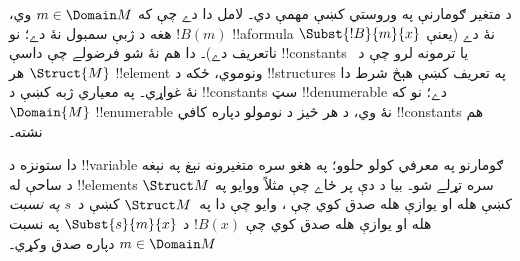 \documentclass[../../../include/open-logic-section]{subfiles}
\begin{document}
\begin{explain}
د متغير ګومارنې په وروستي
 کښې مهمې
دي۔ لامل دا دے چې که
$m \in \Domain M$ وي، هغه د ژبې سمبول نۀ دے؛ نو $!B(m)$
!!a{formula} نۀ دے (يعنې $\Subst{!B}{m}{x}$ ناتعريف دے)۔ دا هم نۀ
شو فرضولے چې داسې !!{constant}s يا ترمونه لرو چې د~$\Struct{M}$ هر
!!{element} ونوموي، ځکه د !!{structure}s په تعريف کښې هېڅ شرط دا
نۀ غواړي۔ په معياري ژبه کښې د !!{constant}s سټ !!{denumerable} دے؛
نو که $\Domain{M}$ !!{enumerable} نۀ وي، د هر څيز د نومولو دپاره
کافي !!{constant}s هم نشته۔

دا ستونزه د !!{variable} ګومارنو په معرفي کولو حلوو؛ په هغو سره
متغيرونه نېغ په نېغه د ساحې له !!{element}s سره تړلے شو۔ بيا د دې
پر ځاے چې مثلاً ووايو
 په
$\Struct M$ کښې هله او يوازې هله صدق کوي چې
، وايو چې دا په~$\Struct M$ کښې د~$s$
\emph{په نسبت} هله او يوازې هله صدق کوي چې $!B(x)$ د
$\Subst{s}{m}{x}$ په نسبت 
$m \in \Domain M$ دپاره صدق وکړي۔
\end{explain}
\end{document}
